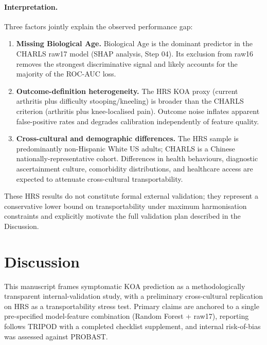 \documentclass[11pt,a4paper]{article}
\begin{document}
\paragraph{Interpretation.} Three factors jointly explain the observed performance gap:

\begin{enumerate}
  \item \textbf{Missing Biological Age.} Biological Age is the dominant predictor in the CHARLS
        raw17 model (SHAP analysis, Step 04). Its exclusion from raw16 removes the strongest
        discriminative signal and likely accounts for the majority of the ROC-AUC loss.
  \item \textbf{Outcome-definition heterogeneity.} The HRS KOA proxy (current arthritis plus
        difficulty stooping/kneeling) is broader than the CHARLS criterion (arthritis plus
        knee-localised pain). Outcome noise inflates apparent false-positive rates and degrades
        calibration independently of feature quality.
  \item \textbf{Cross-cultural and demographic differences.} The HRS sample is predominantly
        non-Hispanic White US adults; CHARLS is a Chinese nationally-representative cohort.
        Differences in health behaviours, diagnostic ascertainment culture, comorbidity
        distributions, and healthcare access are expected to attenuate cross-cultural
        transportability.
\end{enumerate}

These HRS results do not constitute formal external validation; they represent a conservative lower
bound on transportability under maximum harmonisation constraints and explicitly motivate the full
validation plan described in the Discussion.

\section{Discussion}
This manuscript frames symptomatic KOA prediction as a methodologically transparent
internal-validation study, with a preliminary cross-cultural replication on HRS as a transportability
stress test. Primary claims are anchored to a single pre-specified model-feature combination (Random
Forest + raw17), reporting follows TRIPOD\cite{Collins2015} with a completed checklist supplement,
and internal risk-of-bias was assessed against PROBAST\cite{Wolff2019}.
\end{document}
